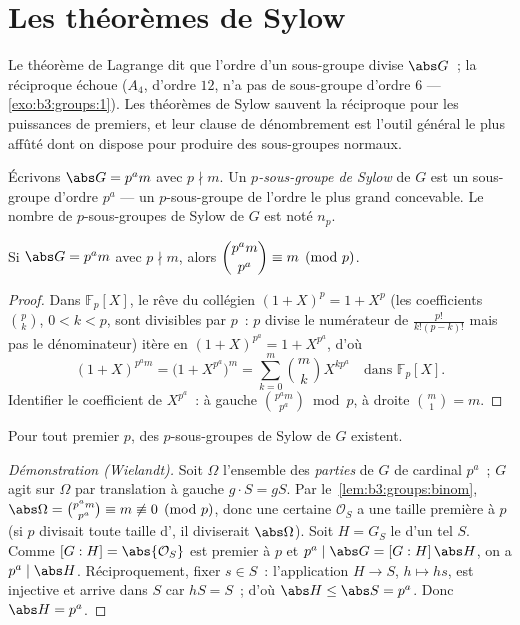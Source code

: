 \section{Les théorèmes de Sylow}

Le théorème de Lagrange dit que l'ordre d'un sous-groupe divise
$\abs G$~; la réciproque échoue ($A_4$, d'ordre $12$, n'a pas de
sous-groupe d'ordre $6$ --- \cref{exo:b3:groups:1}). Les théorèmes
de Sylow sauvent la réciproque pour les puissances de premiers, et
leur clause de dénombrement est l'outil général le plus affûté
dont on dispose pour produire des sous-groupes normaux.

\begin{definition}\label{def:b3:groups:sylow}
Écrivons $\abs G = p^a m$ avec $p \nmid m$. Un \emph{$p$-sous-groupe
de Sylow} de $G$ est un sous-groupe
d'ordre $p^a$ --- un $p$-sous-groupe de l'ordre le plus grand
concevable. Le nombre de $p$-sous-groupes de Sylow de $G$ est
noté $n_p$.
\end{definition}

\begin{lemma}\label{lem:b3:groups:binom}
Si $\abs G = p^a m$ avec $p \nmid m$, alors $\dbinom{p^a m}{p^a}
\equiv m \pmod p$.
\end{lemma}

\begin{proof}
Dans $\mathbb F_p[X]$, le rêve du collégien $(1+X)^p = 1 + X^p$
(les coefficients $\binom pk$, $0<k<p$, sont divisibles par $p$~:
$p$ divise le numérateur de $\frac{p!}{k!(p-k)!}$ mais pas le
dénominateur) itère en $(1+X)^{p^a} = 1 + X^{p^a}$, d'où
\[
(1+X)^{p^a m} = \bigl(1 + X^{p^a}\bigr)^m
= \sum_{k=0}^{m} \binom mk X^{k p^a} \quad\text{dans } \mathbb
F_p[X].
\]
Identifier le coefficient de $X^{p^a}$~: à gauche $\binom{p^a
m}{p^a} \bmod p$, à droite $\binom m1 = m$.
\end{proof}

\begin{theorem}\label{thm:b3:groups:sylow1}
Pour tout premier $p$, des $p$-sous-groupes de Sylow de $G$
existent.
\end{theorem}

\begin{proof}[Démonstration (Wielandt)]
Soit $\Omega$ l'ensemble des \emph{parties} de $G$ de cardinal
$p^a$~; $G$ agit sur $\Omega$ par translation à gauche $g \cdot S
= gS$. Par le~\cref{lem:b3:groups:binom}, $\abs\Omega =
\binom{p^a m}{p^a} \equiv m \not\equiv 0 \pmod p$, donc une
certaine  $\mathcal O_S$ a une taille première à $p$ (si $p$
divisait toute taille d', il diviserait $\abs\Omega$). Soit
$H = G_S$ le  d'un tel $S$. Comme $[G : H] =
\abs{\mathcal O_S}$ est premier à $p$ et $p^a \mid \abs G =
[G:H]\,\abs H$, on a $p^a \mid \abs H$. Réciproquement, fixer $s
\in S$~: l'application $H \to S$, $h \mapsto hs$, est injective et
arrive dans $S$ car $hS = S$~; d'où $\abs H \leq \abs S = p^a$.
Donc $\abs H = p^a$.
\end{proof}

